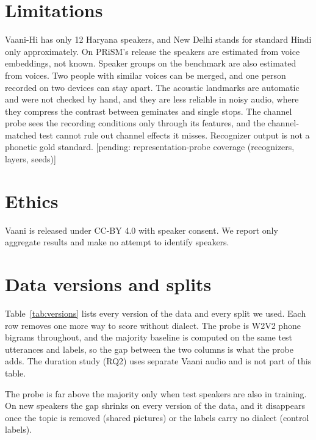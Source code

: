 \documentclass[11pt]{article}
\newcommand{\pending}[1]{{\color{red}[pending: #1]}}
\begin{document}
\section*{Limitations}
Vaani-Hi has only 12 Haryana speakers, and New Delhi stands for standard Hindi only approximately. On PRiSM's
release the speakers are estimated from voice embeddings, not known. Speaker groups on the benchmark are also
estimated from voices. Two people with similar voices can be merged, and one person recorded on two devices can
stay apart. The acoustic landmarks are automatic and were not checked by hand, and they are less reliable in noisy audio,
where they compress the contrast between geminates and single stops. The channel probe sees the recording
conditions only through its features, and the channel-matched test cannot rule out channel effects it misses.
Recognizer output is not a phonetic gold standard.
\pending{representation-probe coverage (recognizers, layers, seeds)}

\section*{Ethics}
Vaani is released under CC-BY 4.0 with speaker consent. We report only aggregate results and make no attempt to
identify speakers.



\appendix
\section{Data versions and splits}
\label{app:versions}
Table~\ref{tab:versions} lists every version of the data and every split we used. Each row removes one more way
to score without dialect. The probe is W2V2 phone bigrams throughout, and the majority baseline is computed on the
same test utterances and labels, so the gap between the two columns is what the probe adds. The duration study
(RQ2) uses separate Vaani audio and is not part of this table.

The probe is far above the majority only when test speakers are also in training. On new speakers the gap shrinks
on every version of the data, and it disappears once the topic is removed (shared pictures) or the labels carry no
dialect (control labels).

\begin{table}[t]
\centering\footnotesize

\caption{Every data version and split, from PRiSM's release to the benchmark. Recall@1 on the test set;
probe values are mean $\pm$ sd over seeds. With control labels, both columns score the reassigned locations.}
\label{tab:versions}
\end{table}
\end{document}
